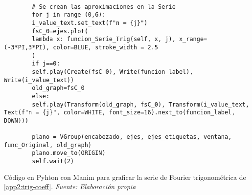 \begin{longlisting}
\begin{verbatim}
		
		# Se crean las aproximaciones en la Serie
		for j in range (0,6):
		i_value_text.set_text(f"n = {j}")
		fsC_0=ejes.plot(
		lambda x: funcion_Serie_Trig(self, x, j), x_range=(-3*PI,3*PI), color=BLUE, stroke_width = 2.5
		)
		if j==0:
		self.play(Create(fsC_0), Write(funcion_label), Write(i_value_text))
		old_graph=fsC_0
		else:
		self.play(Transform(old_graph, fsC_0), Transform(i_value_text, Text(f"n = {j}", color=WHITE, font_size=16).next_to(funcion_label, DOWN)))
		
		plano = VGroup(encabezado, ejes, ejes_etiquetas, ventana, func_Original, old_graph)
		plano.move_to(ORIGIN)
		self.wait(2)
	\end{verbatim}
	\caption[Código en Pyhton con Manim para graficar la serie de Fourier trigonométrica de \ref{app2:trig-coeff}.] {Código en Pyhton con Manim para graficar la serie de Fourier trigonométrica de \ref{app2:trig-coeff}. \textit{Fuente: Elaboración propia}} 
\end{longlisting}


